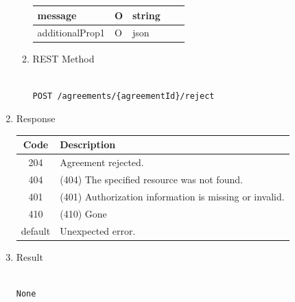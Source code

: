 \begin{enumerate}
\begin{enumerate}
\begin{table}[H]
\begin{center}
\begin{tabular}{|p{3cm}|l|p{3cm}|p{3cm}|p{4cm}|}
message 		& O	& 	string				&		&	 	\\ 
\hline

additionalProp1 & O	& 	json				&		&	 	\\ 
\hline

\end{tabular}
\end{center}

\end{table}

\item REST Method

\begin{tcolorbox}[boxrule=0pt, frame empty]
\begin{verbatim} 

POST /agreements/{agreementId}/reject

\end{verbatim}
\end{tcolorbox}

\end{enumerate}

\item Response

\begin{table}[H]
\footnotesize

\begin{center}
\begin{tabular}{|c|l|} 
\hline
\rowcolor{lightgray}	Code 		& 	Description \\
\hline
204	 		&	Agreement rejected. \\
\hline
404			&	(404) The specified resource was not found. \\
\hline
401			&	(401) Authorization information is missing or invalid. \\
\hline
410			&	(410) Gone \\
\hline
default		&	Unexpected error. \\
\hline
\end{tabular}
\end{center}

\end{table}

\item Result

\begin{tcolorbox}[boxrule=0pt, frame empty]
\begin{verbatim}

None

\end{verbatim}
\end{tcolorbox}


\end{enumerate}
